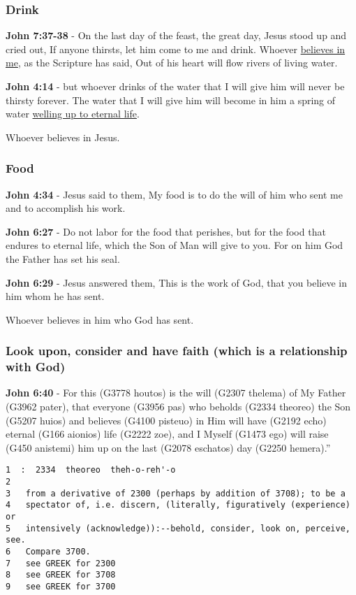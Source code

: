 \documentclass[11pt]{article}
\begin{document}
\subsubsection{Drink}
\label{sec:org3f92d0d}
\textbf{John 7:37-38} - On the last day of the feast, the great day, Jesus stood up and cried out, If anyone thirsts, let him come to me and drink. Whoever \uline{believes in me}, as the Scripture has said, Out of his heart will flow rivers of living water.

\textbf{John 4:14} - but whoever drinks of the water that I will give him will never be thirsty forever. The water that I will give him will become in him a spring of water \uline{welling up to eternal life}.

Whoever believes in Jesus.

\subsubsection{Food}
\label{sec:org3dd0fbd}
\textbf{John 4:34} - Jesus said to them, My food is to do the will of him who sent me and to accomplish his work.

\textbf{John 6:27} - Do not labor for the food that perishes, but for the food that endures to eternal life, which the Son of Man will give to you. For on him God the Father has set his seal.

\textbf{John 6:29} - Jesus answered them, This is the work of God, that you believe in him whom he has sent.

Whoever believes in him who God has sent.

\subsubsection{Look upon, consider and have faith (which is a relationship with God)}
\label{sec:org1535114}
\textbf{John 6:40} - For this (G3778 houtos) is the will (G2307 thelema) of My Father (G3962 pater), that everyone (G3956 pas) who beholds (G2334 theoreo) the Son (G5207 huios) and believes (G4100 pisteuo) in Him will have (G2192 echo) eternal (G166 aionios) life (G2222 zoe), and I Myself (G1473 ego) will raise (G450 anistemi) him up on the last (G2078 eschatos) day (G2250 hemera).”

\begin{verbatim}
1  :  2334  theoreo  theh-o-reh'-o
2  
3   from a derivative of 2300 (perhaps by addition of 3708); to be a
4   spectator of, i.e. discern, (literally, figuratively (experience) or
5   intensively (acknowledge)):--behold, consider, look on, perceive, see.
6   Compare 3700.
7   see GREEK for 2300
8   see GREEK for 3708
9   see GREEK for 3700
\end{verbatim}
\end{document}
